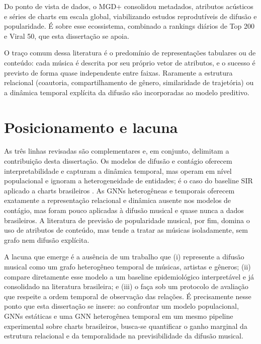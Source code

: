 Do ponto de vista de dados, o MGD+ \citep{seufitelli2023dsw} consolidou metadados, atributos acústicos e séries de charts em escala global, viabilizando estudos reprodutíveis de difusão e popularidade. É sobre esse ecossistema, combinado a rankings diários de Top 200 e Viral 50, que esta dissertação se apoia.

O traço comum dessa literatura é o predomínio de representações tabulares ou de conteúdo: cada música é descrita por seu próprio vetor de atributos, e o sucesso é previsto de forma quase independente entre faixas. Raramente a estrutura relacional (coautoria, compartilhamento de gênero, similaridade de trajetória) ou a dinâmica temporal explícita da difusão são incorporadas ao modelo preditivo.


\section{Posicionamento e lacuna}

As três linhas revisadas são complementares e, em conjunto, delimitam a contribuição desta dissertação. Os modelos de difusão e contágio oferecem interpretabilidade e capturam a dinâmica temporal, mas operam em nível populacional e ignoram a heterogeneidade de entidades; é o caso do baseline SIR aplicado a charts brasileiros \citep{oliveira2025brasnam}. As GNNs heterogêneas e temporais oferecem exatamente a representação relacional e dinâmica ausente nos modelos de contágio, mas foram pouco aplicadas à difusão musical e quase nunca a dados brasileiros. A literatura de previsão de popularidade musical, por fim, domina o uso de atributos de conteúdo, mas tende a tratar as músicas isoladamente, sem grafo nem difusão explícita.

A lacuna que emerge é a ausência de um trabalho que (i) represente a difusão musical como um grafo heterogêneo temporal de músicas, artistas e gêneros; (ii) compare diretamente esse modelo a um baseline epidemiológico interpretável e já consolidado na literatura brasileira; e (iii) o faça sob um protocolo de avaliação que respeite a ordem temporal de observação das relações. É precisamente nesse ponto que esta dissertação se insere: ao confrontar um modelo populacional, GNNs estáticas e uma GNN heterogênea temporal em um mesmo pipeline experimental sobre charts brasileiros, busca-se quantificar o ganho marginal da estrutura relacional e da temporalidade na previsibilidade da difusão musical.
